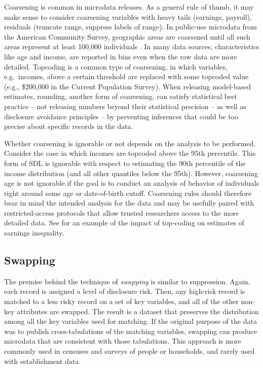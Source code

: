 \documentclass[
]{book}
\begin{document}
Coarsening is common in microdata releases. As a general rule of thumb, it may make sense to consider coarsening variables with heavy tails (earnings, payroll), residuals (truncate range, suppress labels of range).
In public-use microdata from the American Community Survey, geographic areas are coarsened until all such areas represent at least 100,000 individuals \citep{us_census_bureau_finalpublic_2011}. In many data sources, characteristics like age and income, are reported in bins even when the raw data are more detailed. Topcoding is a common type of coarsening, in which variables, e.g.~incomes, above a certain threshold are replaced with some topcoded value (e.g., \$200,000 in the Current Population Survey). When releasing model-based estimates, rounding, another form of coarsening, can satisfy statistical best practice -- not releasing numbers beyond their statistical precision -- as well as disclosure avoidance principles -- by preventing inferences that could be too precise about specific records in the data.

Whether coarsening is ignorable or not depends on the analysis to be performed. Consider the case in which incomes are topcoded above the 95th percentile. This form of SDL is ignorable with respect to estimating the 90th percentile of the income distribution (and all other quantiles below the 95th). However, coarsening age is not ignorable if the goal is to conduct an analysis of behavior of individuals right around some age or date-of-birth cutoff. Coarsening rules should therefore bear in mind the intended analysis for the data and may be usefully paired with restricted-access protocols that allow trusted researchers access to the more detailed data. See \citet{burkhauser_estimating_2011} for an example of the impact of top-coding on estimates of earnings inequality.

\hypertarget{swapping}{%
\subsection{Swapping}\label{swapping}}

The premise behind the technique of \emph{swapping} is similar to suppression. Again, each record is assigned a level of disclosure risk. Then, any high-risk record is matched to a less risky record on a set of key variables, and all of the other non-key attributes are swapped. The result is a dataset that preserves the distribution among all the key variables used for matching.
If the original purpose of the data was to publish cross-tabulations of the matching variables, swapping can produce microdata that are consistent with those tabulations.
This approach is more commonly used in censuses and surveys of people or households, and rarely used with establishment data.
\end{document}
